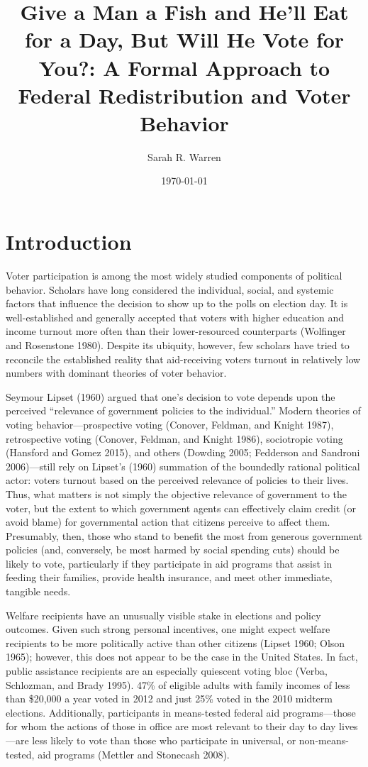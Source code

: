 \documentclass[12pt]{paper}
\begin{document}
\title{Give a Man a Fish and He'll Eat for a Day, But Will He Vote for You?: A Formal Approach to Federal Redistribution and Voter Behavior}
\author{Sarah R. Warren}
\date{\today}
\maketitle

\section{Introduction}
Voter participation is among the most widely studied components of political behavior. Scholars have long considered the individual, social, and systemic factors that influence the decision to show up to the polls on election day. It is well-established and generally accepted that voters with higher education and income turnout more often than their lower-resourced counterparts (Wolfinger and Rosenstone 1980).  Despite its ubiquity, however, few scholars have tried to reconcile the established reality that aid-receiving voters turnout in relatively low numbers with dominant theories of voter behavior.

Seymour Lipset (1960) argued that one's decision to vote depends upon the perceived “relevance of government policies to the individual.” Modern theories of voting behavior—prospective voting (Conover, Feldman, and Knight 1987), retrospective voting (Conover, Feldman, and Knight 1986), sociotropic voting (Hansford and Gomez 2015), and others (Dowding 2005; Fedderson and Sandroni 2006)—still rely on Lipset’s (1960) summation of the boundedly rational political actor: voters turnout based on the perceived relevance of policies to their lives. Thus, what matters is not simply the objective relevance of government to the voter, but the extent to which government agents can effectively claim credit (or avoid blame) for governmental action that citizens perceive to affect them. Presumably, then, those who stand to benefit the most from generous government policies (and, conversely, be most harmed by social spending cuts) should be likely to vote, particularly if they participate in aid programs that assist in feeding their families, provide health insurance, and meet other immediate, tangible needs.

Welfare recipients have an unusually visible stake in elections and policy outcomes. Given such strong personal incentives, one might expect welfare recipients to be more politically active than other citizens (Lipset 1960; Olson 1965); however, this does not appear to be the case in the United States. In fact, public assistance recipients are an especially quiescent voting bloc (Verba, Schlozman, and Brady 1995). 47\% of eligible adults with family incomes of less than \$20,000 a year voted in 2012 and just 25\% voted in the 2010 midterm elections. Additionally, participants in means-tested federal aid programs—those for whom the actions of those in office are most relevant to their day to day lives—are less likely to vote than those who participate in universal, or non-means-tested, aid programs (Mettler and Stonecash 2008).  
\end{document}
